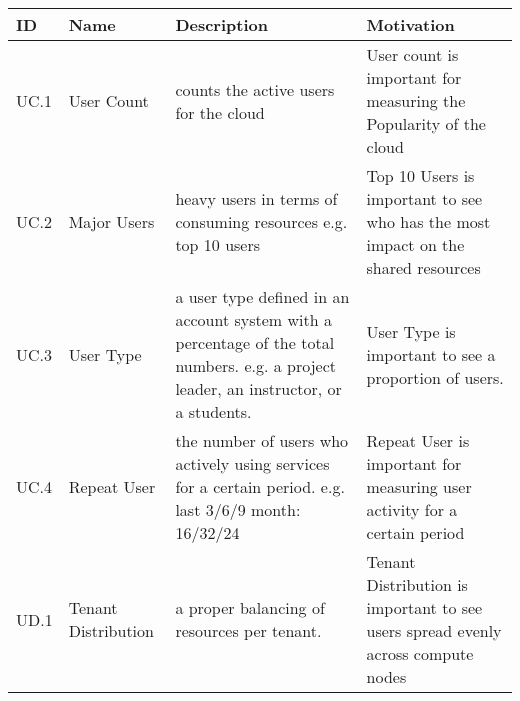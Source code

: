 \newcommand{\eTABLE}{\end{tabular}
\end{center}
\end{scriptsize}
\end{table*}}

\newcommand{\bTABLE}[2]{
\begin{table*}[P]
\caption{#1}
\label{#2}
\bigskip
\begin{scriptsize}
\begin{center}
\begin{tabular}{lp{0.1\textwidth}p{0.4\textwidth}p{0.4\textwidth}}
\hline
\rowcolor{blue!20} \bf ID & \bf Name & \bf Description & \bf Motivation \\
\hline}

\newenvironment{METRICTABLE}[2] {\bTABLE{#1}{#2}}{\eTABLE}


\begin{METRICTABLE}{User related metrics.}{T:metrics-bigtable}
UC.1 & User Count &  counts the active users for the cloud                                           & User count is  important  for  measuring  the Popularity of the cloud \\ \hline
UC.2 & Major Users & heavy users in terms of consuming resources e.g. top 10 users & Top 10 Users is important to see who has the most impact on the shared resources \\  \hline
UC.3 & User Type   & a user type defined in an account system with a percentage of the total numbers. e.g. a project leader, an instructor, or a students. & User Type is important to see a proportion of users. \\ \hline
UC.4 & Repeat User& the number of users who actively using services for a certain period. e.g. last 3/6/9 month: 16/32/24 & Repeat User is important for measuring user activity for a certain period \\ \hline
UD.1 & Tenant Distribution& a proper balancing of resources per tenant. & Tenant Distribution is important to see users spread evenly across compute nodes \\ \hline
\end{METRICTABLE}



